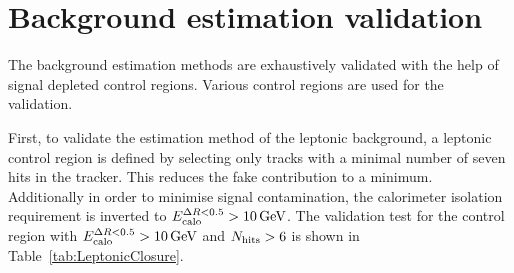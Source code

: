 \section{Background estimation validation}
\label{sec:BkgValidation}

The background estimation methods are exhaustively validated with the help of signal depleted control regions.
Various control regions are used for the validation.

First, to validate the estimation method of the leptonic background, a leptonic control region is defined by selecting only tracks with a minimal number of seven hits in the tracker.
This reduces the fake contribution to a minimum.
Additionally in order to minimise signal contamination, the calorimeter isolation requirement is inverted to $E^{\Delta R<0.5}_{\text{calo}}>10\,\text{Ge}\kern-0.06667em\text{V}$.
The validation test for the control region with $E^{\Delta R<0.5}_{\text{calo}}>10\,\text{Ge}\kern-0.06667em\text{V}$ and $N_{\text{hits}}>6$ is shown in Table~\ref{tab:LeptonicClosure}.
\renewcommand{\arraystretch}{1.5}
